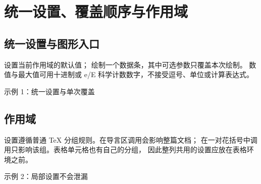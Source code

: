 \section{统一设置、覆盖顺序与作用域}
\subsection{统一设置与图形入口}
 设置当前作用域的默认值；
 绘制一个数据条，其中可选参数只覆盖本次绘制。
数值与最大值可用十进制或 e/E 科学计数数字，不接受逗号、单位或计算表达式。

\begin{example}{示例 1：统一设置与单次覆盖}


\end{example}

\subsection{作用域}
设置遵循普通 TeX 分组规则。在导言区调用会影响整篇文档；
在一对花括号中调用只影响该组。表格单元格也有自己的分组，
因此整列共用的设置应放在表格环境之前。

\begin{example}{示例 2：局部设置不会泄漏}
{
 }

\end{example}
